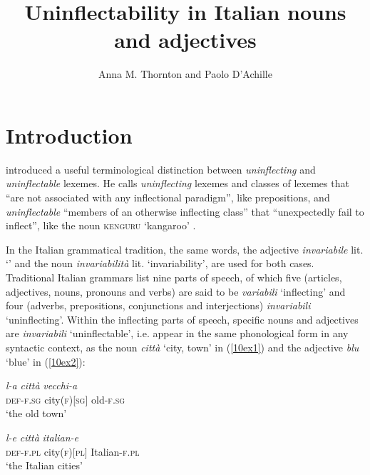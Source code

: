 \documentclass[output=paper,colorlinks,citecolor=brown]{langscibook}
\author{Anna M. Thornton\orcid{}\affiliation{Università dell'Aquila} and Paolo D’Achille\orcid{}\affiliation{Università Roma Tre}}
\title{Uninflectability in Italian nouns and adjectives}
\begin{document}
\maketitle

\section{Introduction} 

\citet{spencer2020} introduced a useful terminological distinction between \emph{uninflecting} and \emph{uninflectable} lexemes. He calls \emph{uninflecting} lexemes and classes of lexemes that ``are not associated with any inflectional paradigm'', like  prepositions, and \emph{uninflectable} ``members of an otherwise inflecting class'' that ``unexpectedly fail to inflect'', like the  noun \textsc{kenguru} `kangaroo' \citep[142]{spencer2020}.

In the Italian grammatical tradition, the same words, the adjective \emph{invariabile} lit. `' and the noun \emph{invariabilità} lit. `invariability', are used for both cases. Traditional Italian grammars list nine parts of speech, of which five (articles, adjectives, nouns, pronouns and verbs) are said to be \emph{variabili} `inflecting' and four (adverbs, prepositions, conjunctions and interjections) \emph{invariabili} `uninflecting'. Within the inflecting parts of speech, specific nouns and adjectives are \emph{invariabili} `uninflectable', i.e. appear in the same phonological form in any syntactic context, as the noun \emph{città} `city, town' in (\ref{10ex1}) and the adjective \emph{blu} `blue' in (\ref{10ex2}):

\begin{exe}
	\ex \label{10ex1}
	\begin{xlist}
		\ex 
		\gll \emph{l-a} \emph{città} \emph{vecchi-a} \\
		\textsc{def-f.sg} city(\textsc{f})[\textsc{sg}] old-\textsc{f.sg} \\
		\trans ‘the old town’
		
		\ex 
		\gll \emph{l-e} \emph{città} \emph{italian-e} \\
		\textsc{def-f.pl} city(\textsc{f})[\textsc{pl}] Italian-\textsc{f.pl} \\
		\trans ‘the Italian cities’
	\end{xlist}
\end{exe}
\end{document}
